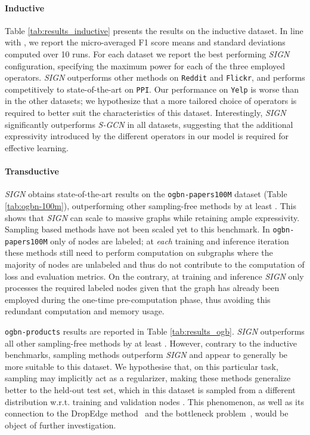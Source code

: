 \documentclass{article}
\begin{document}
\paragraph{Inductive}
Table \ref{tab:results_inductive} presents the results on the inductive dataset. In line with \cite{DBLP:journals/corr/abs-1907-04931}, we report the micro-averaged F1 score means and standard deviations computed over 10 runs. For each dataset we report the best performing \textit{SIGN} configuration, specifying the maximum power for each of the three employed operators.
\textit{SIGN} outperforms other methods on \texttt{Reddit} and \texttt{Flickr}, and performs competitively to state-of-the-art on \texttt{PPI}. Our performance on \texttt{Yelp} is worse than in the other datasets; we hypothesize that a more tailored choice of operators is required to better suit the characteristics of this dataset.
Interestingly, \textit{SIGN} significantly outperforms \textit{S-GCN} in all datasets, suggesting that the additional expressivity introduced by the different operators in our model is required for effective learning.

\paragraph{Transductive}
\textit{SIGN} obtains state-of-the-art results on the \newline \texttt{ogbn-papers100M} dataset (Table \ref{tab:ogbn-100m}), outperforming other sampling-free methods by at least . This shows that \textit{SIGN} can scale to massive graphs while retaining ample expressivity. Sampling based methods have not been scaled yet to this benchmark. In \texttt{ogbn-papers100M} only  of nodes are labeled; at \emph{each} training and inference iteration these methods still need to perform computation on subgraphs where the majority of nodes are unlabeled and thus do not contribute to the computation of loss and evaluation metrics. On the contrary, at training and inference \textit{SIGN} only processes the required labeled nodes given that the graph has already been employed during the one-time pre-computation phase, thus avoiding this redundant computation and memory usage.

\texttt{ogbn-products} results are reported in Table \ref{tab:results_ogb}.
\textit{SIGN} outperforms all other sampling-free methods by at least . However, contrary to the inductive benchmarks, sampling methods outperform \textit{SIGN} and appear to generally be more suitable to this dataset. We hypothesise that, on this particular task, sampling may implicitly act as a regularizer, making these methods generalize better to the held-out test set, which in this dataset is sampled from a different distribution w.r.t. training and validation nodes \cite{ogb2020}. This phenomenon, as well as its connection to the DropEdge method~\cite{rong2019dropedge} and the bottleneck problem~\cite{alon2020bottleneck}, would be object of further investigation. 
\end{document}

